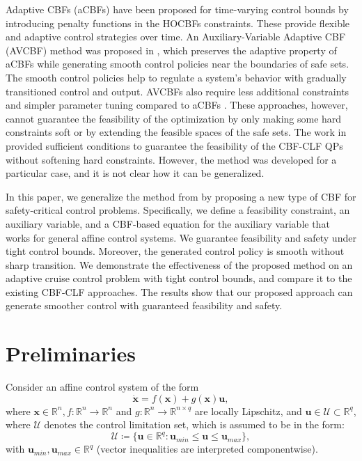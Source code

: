 \documentclass[letterpaper, 10 pt, conference]{ieeeconf}
\theoremstyle{definition}
\begin{document}
Adaptive CBFs (aCBFs) \cite{xiao2021adaptive} have been proposed for time-varying control bounds by introducing penalty functions in the HOCBFs constraints. These  provide flexible and adaptive control strategies over time. An Auxiliary-Variable Adaptive CBF (AVCBF) method was proposed in \cite{liu2023auxiliary}, which preserves the adaptive property of aCBFs \cite{xiao2021adaptive} while generating smooth control policies near the boundaries of safe sets. The smooth control policies help to regulate a system's behavior with gradually transitioned control and output. AVCBFs also require less additional constraints and simpler parameter tuning compared to aCBFs \cite{xiao2021adaptive}. These approaches, however, cannot guarantee the feasibility of the optimization by only making some hard constraints soft or by extending the feasible spaces of the safe sets. The work in \cite{xiao2022sufficient} provided sufficient conditions to guarantee the feasibility of the CBF-CLF QPs without softening hard constraints. However, the method was developed for a particular case, and it is not clear how it can be generalized. 

In this paper, we generalize the method from \cite{xiao2022sufficient} by proposing a new type of CBF for safety-critical control problems. Specifically, we define a feasibility constraint, an auxiliary variable,  and a CBF-based equation for the auxiliary variable that works for general affine control systems. We guarantee feasibility and safety under tight control bounds. Moreover, the generated control policy is smooth without sharp transition. We demonstrate the effectiveness of the proposed method on an adaptive cruise control problem with tight control bounds, and compare it to the existing CBF-CLF approaches. The results show that our proposed approach can generate smoother control with guaranteed feasibility and safety.

\section{Preliminaries}
\label{sec:Preliminaries}

Consider an affine control system of the form
\begin{equation}
\label{eq:affine-control-system}
\dot{\boldsymbol{x}}=f(\boldsymbol{x})+g(\boldsymbol{x})\boldsymbol{u},
\end{equation}
 where $\boldsymbol{x}\in \mathbb{R}^{n}, f:\mathbb{R}^{n}\to\mathbb{R}^{n}$ and $g:\mathbb{R}^{n}\to\mathbb{R}^{n\times q}$ are locally Lipschitz, and $\boldsymbol{u}\in \mathcal U\subset \mathbb{R}^{q}$, where $\mathcal U$ denotes the control limitation set, which is assumed to be in the form: 
\begin{equation}\label{eq:control-constraint}
\mathcal U \coloneqq \{\boldsymbol{u}\in \mathbb{R}^{q}:\boldsymbol{u}_{min}\le \boldsymbol{u} \le \boldsymbol{u}_{max} \}, 
\end{equation}
with $\boldsymbol{u}_{min},\boldsymbol{u}_{max}\in \mathbb{R}^{q}$ (vector inequalities are interpreted componentwise).
 
\end{document}

